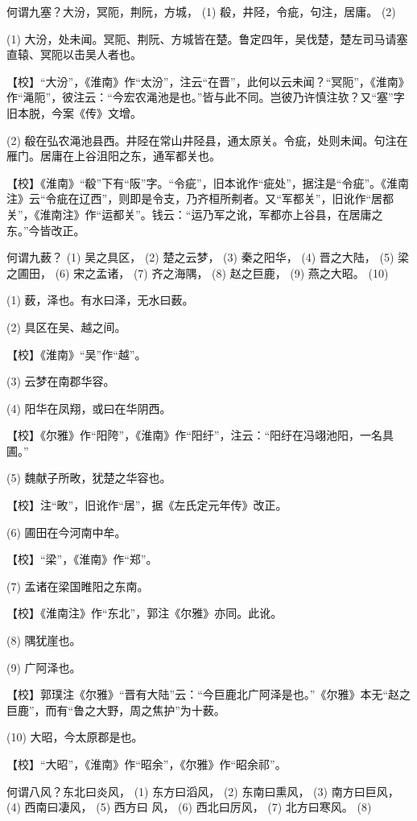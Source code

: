 \documentclass[12pt,UTF8]{ctexbook}
\begin{document}
何谓九塞？大汾，冥阨，荆阮，方城， (1) 殽，井陉，令疵，句注，居庸。 (2)

(1) 大汾，处未闻。冥阨、荆阮、方城皆在楚。鲁定四年，吴伐楚，楚左司马请塞直辕、冥阨以击吴人者也。

【校】“大汾”，《淮南》作“太汾”，注云“在晋”，此何以云未闻？“冥阨”，《淮南》作“渑阨”，彼注云：“今宏农渑池是也。”皆与此不同。岂彼乃许慎注欤？又“塞”字旧本脱，今案《传》文增。

(2) 殽在弘农渑池县西。井陉在常山井陉县，通太原关。令疵，处则未闻。句注在雁门。居庸在上谷沮阳之东，通军都关也。

【校】《淮南》“殽”下有“阪”字。“令疵”，旧本讹作“疵处”，据注是“令疵”。《淮南注》云“令疵在辽西”，则即是令支，乃齐桓所刜者。又“军都关”，旧讹作“居都关”，《淮南注》作“运都关”。钱云：“运乃军之讹，军都亦上谷县，在居庸之东。”今皆改正。

何谓九薮？ (1) 吴之具区， (2) 楚之云梦， (3) 秦之阳华， (4) 晋之大陆， (5) 梁之圃田， (6) 宋之孟诸， (7) 齐之海隅， (8) 赵之巨鹿， (9) 燕之大昭。 (10)

(1) 薮，泽也。有水曰泽，无水曰薮。

(2) 具区在吴、越之间。

【校】《淮南》“吴”作“越”。

(3) 云梦在南郡华容。

(4) 阳华在凤翔，或曰在华阴西。

【校】《尔雅》作“阳陓”，《淮南》作“阳纡”，注云：“阳纡在冯翊池阳，一名具圃。”

(5) 魏献子所畋，犹楚之华容也。

【校】注“畋”，旧讹作“居”，据《左氏定元年传》改正。

(6) 圃田在今河南中牟。

【校】“梁”，《淮南》作“郑”。

(7) 孟诸在梁国睢阳之东南。

【校】《淮南注》作“东北”，郭注《尔雅》亦同。此讹。

(8) 隅犹崖也。

(9) 广阿泽也。

【校】郭璞注《尔雅》“晋有大陆”云：“今巨鹿北广阿泽是也。”《尔雅》本无“赵之巨鹿”，而有“鲁之大野，周之焦护”为十薮。

(10) 大昭，今太原郡是也。

【校】“大昭”，《淮南》作“昭余”，《尔雅》作“昭余祁”。

何谓八风？东北曰炎风， (1) 东方曰滔风， (2) 东南曰熏风， (3) 南方曰巨风， (4) 西南曰凄风， (5) 西方曰 风， (6) 西北曰厉风， (7) 北方曰寒风。 (8)
\end{document}
